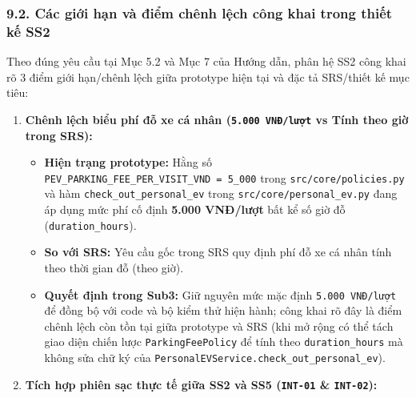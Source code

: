 \documentclass[11pt,a4paper]{article}
\providecommand{\tightlist}{%
  \setlength{\itemsep}{0pt}\setlength{\parskip}{0pt}}
\begin{document}
\hypertarget{cuxe1c-giux1edbi-hux1ea1n-vuxe0-ux111iux1ec3m-chuxeanh-lux1ec7ch-cuxf4ng-khai-trong-thiux1ebft-kux1ebf-ss2}{%
\subsubsection{9.2. Các giới hạn và điểm chênh lệch công khai trong
thiết kế
SS2}\label{cuxe1c-giux1edbi-hux1ea1n-vuxe0-ux111iux1ec3m-chuxeanh-lux1ec7ch-cuxf4ng-khai-trong-thiux1ebft-kux1ebf-ss2}}

Theo đúng yêu cầu tại Mục 5.2 và Mục 7 của Hướng dẫn, phân hệ SS2 công
khai rõ 3 điểm giới hạn/chênh lệch giữa prototype hiện tại và đặc tả
SRS/thiết kế mục tiêu:

\begin{enumerate}
\def\labelenumi{\arabic{enumi}.}
\tightlist
\item
  \textbf{Chênh lệch biểu phí đỗ xe cá nhân (\texttt{5.000\ VNĐ/lượt} vs
  Tính theo giờ trong SRS):}

  \begin{itemize}
  \tightlist
  \item
    \textbf{Hiện trạng prototype:} Hằng số
    \texttt{PEV\_PARKING\_FEE\_PER\_VISIT\_VND\ =\ 5\_000} trong
    \texttt{src/core/policies.py} và hàm
    \texttt{check\_out\_personal\_ev} trong
    \texttt{src/core/personal\_ev.py} đang áp dụng mức phí cố định
    \textbf{5.000 VNĐ/lượt} bất kể số giờ đỗ (\texttt{duration\_hours}).
  \item
    \textbf{So với SRS:} Yêu cầu gốc trong SRS quy định phí đỗ xe cá
    nhân tính theo thời gian đỗ (theo giờ).
  \item
    \textbf{Quyết định trong Sub3:} Giữ nguyên mức mặc định
    \texttt{5.000\ VNĐ/lượt} để đồng bộ với code và bộ kiểm thử hiện
    hành; công khai rõ đây là điểm chênh lệch còn tồn tại giữa prototype
    và SRS (khi mở rộng có thể tách giao diện chiến lược
    \texttt{ParkingFeePolicy} để tính theo \texttt{duration\_hours} mà
    không sửa chữ ký của
    \texttt{PersonalEVService.check\_out\_personal\_ev}).
  \end{itemize}
\item
  \textbf{Tích hợp phiên sạc thực tế giữa SS2 và SS5 (\texttt{INT-01} \&
  \texttt{INT-02}):}


\end{enumerate}
\end{document}
